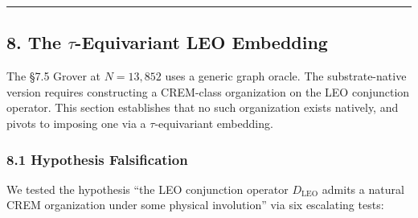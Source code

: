 \documentclass[
]{article}
\begin{document}
\begin{center}\rule{0.5\linewidth}{0.5pt}\end{center}

\subsection{\texorpdfstring{8. The \(\tau\)-Equivariant LEO
Embedding}{8. The \textbackslash tau-Equivariant LEO Embedding}}\label{the-tau-equivariant-leo-embedding}

The §7.5 Grover at \(N = 13{,}852\) uses a generic graph oracle. The
substrate-native version requires constructing a CREM-class organization
on the LEO conjunction operator. This section establishes that no such
organization exists natively, and pivots to imposing one via a
\(\tau\)-equivariant embedding.

\subsubsection{8.1 Hypothesis
Falsification}\label{hypothesis-falsification}

We tested the hypothesis ``the LEO conjunction operator \(D_\text{LEO}\)
admits a natural CREM organization under some physical involution'' via
six escalating tests:
\end{document}
